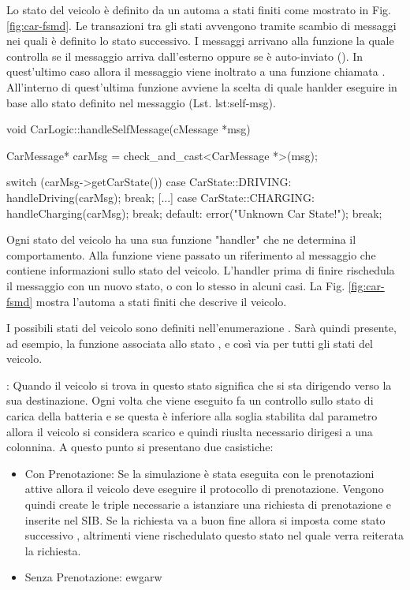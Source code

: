 Lo stato del veicolo è definito da un automa a stati finiti come mostrato in Fig. \ref{fig:car-fsmd}. Le transazioni tra gli stati avvengono tramite scambio di messaggi nei quali è definito lo stato successivo. I messaggi arrivano alla funzione  la quale controlla se il messaggio arriva dall'esterno oppure se è auto-inviato (). In quest'ultimo caso allora il messaggio viene inoltrato a una funzione chiamata . All'interno di quest'ultima funzione avviene la scelta di quale hanlder eseguire in base allo stato definito nel messaggio (Lst. lst:self-msg).

\begin{cpp}[caption={Funzione di scelta dello stato}, label={lst:self-msg}]
void CarLogic::handleSelfMessage(cMessage *msg) {
	CarMessage* carMsg = check_and_cast<CarMessage *>(msg);
	
	switch (carMsg->getCarState()) {
		case CarState::DRIVING:
			handleDriving(carMsg);
			break;
		[...]
		case CarState::CHARGING:
			handleCharging(carMsg);
			break;
		default:
			error("Unknown Car State!");
			break;
	}	
}
\end{cpp}

Ogni stato del veicolo ha una sua funzione "handler" che ne determina il comportamento. Alla funzione viene passato un riferimento al messaggio che contiene informazioni sullo stato del veicolo. L'handler prima di finire rischedula il messaggio con un nuovo stato, o con lo stesso in alcuni casi. La Fig. \ref{fig:car-fsmd} mostra l'automa a stati finiti che descrive il veicolo. 

I possibili stati del veicolo sono definiti nell'enumerazione . Sarà quindi presente, ad esempio, la funzione  associata allo stato , e così via per tutti gli stati del veicolo.

\begin{description}
	\item \label{state:driving} : Quando il veicolo si trova in questo stato significa che si sta dirigendo verso la sua destinazione. Ogni volta che viene eseguito fa un controllo sullo stato di carica della batteria e se questa è inferiore alla soglia stabilita dal parametro  allora il veicolo si considera scarico e quindi riuslta necessario dirigesi a una colonnina. A questo punto si presentano due casistiche:
	\begin{itemize}
		\item{Con Prenotazione}: Se la simulazione è stata eseguita con le prenotazioni attive allora il veicolo deve eseguire il protocollo di prenotazione. Vengono quindi create le triple necessarie a istanziare una richiesta di prenotazione e inserite nel SIB. Se la richiesta va a buon fine allora si imposta come stato successivo , altrimenti viene rischedulato questo stato nel quale verra reiterata la richiesta.
		\item{Senza Prenotazione}: ewgarw
	\end{itemize}
\end{description}
	


